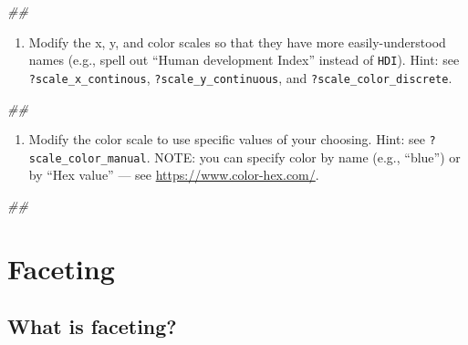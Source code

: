 \documentclass[
]{book}
\newenvironment{Shaded}{\begin{snugshade}}{\end{snugshade}}
\newcommand{\CommentTok}[1]{\textcolor[rgb]{0.56,0.35,0.01}{\textit{#1}}}
\providecommand{\tightlist}{%
  \setlength{\itemsep}{0pt}\setlength{\parskip}{0pt}}
\begin{document}
\begin{Shaded}
\begin{Highlighting}[]
\CommentTok{## }
\end{Highlighting}
\end{Shaded}

\begin{enumerate}
\def\labelenumi{\arabic{enumi}.}
\setcounter{enumi}{1}
\tightlist
\item
  Modify the x, y, and color scales so that they have more easily-understood names (e.g., spell out ``Human development Index'' instead of \texttt{HDI}). Hint: see \texttt{?scale\_x\_continous}, \texttt{?scale\_y\_continuous}, and \texttt{?scale\_color\_discrete}.
\end{enumerate}

\begin{Shaded}
\begin{Highlighting}[]
\CommentTok{## }
\end{Highlighting}
\end{Shaded}

\begin{enumerate}
\def\labelenumi{\arabic{enumi}.}
\setcounter{enumi}{2}
\tightlist
\item
  Modify the color scale to use specific values of your choosing. Hint: see \texttt{?scale\_color\_manual}. NOTE: you can specify color by name (e.g., ``blue'') or by ``Hex value'' --- see \url{https://www.color-hex.com/}.
\end{enumerate}

\begin{Shaded}
\begin{Highlighting}[]
\CommentTok{## }
\end{Highlighting}
\end{Shaded}

\hypertarget{faceting}{%
\section{Faceting}\label{faceting}}

\hypertarget{what-is-faceting}{%
\subsection{What is faceting?}\label{what-is-faceting}}
\end{document}
